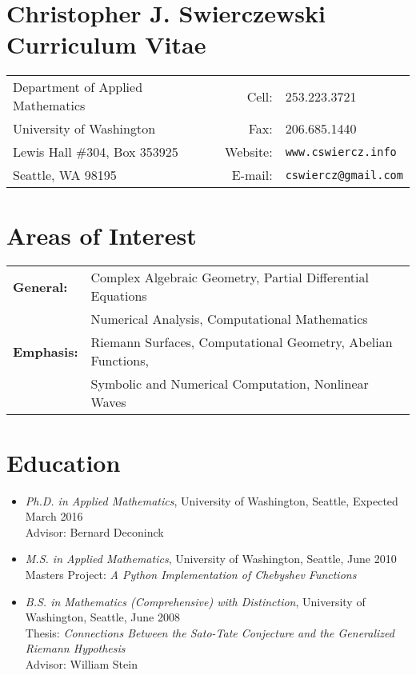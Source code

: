 \documentclass{article}
\begin{document}

\section*{Christopher J. Swierczewski \hspace{4.9cm} Curriculum Vitae}

\begin{tabular}{lrl}
  Department of Applied Mathematics \hspace{5cm} & Cell: & 253.223.3721 \\
  University of Washington                       & Fax:     & 206.685.1440 \\
  Lewis Hall \#304, Box 353925        & Website: & \tt www.cswiercz.info \\
  Seattle, WA 98195                   & E-mail:  & \tt cswiercz@gmail.com
\end{tabular}




\section*{Areas of Interest}

\begin{tabular}{ll}
  \bf General: & Complex Algebraic Geometry, Partial Differential Equations \\
               & Numerical Analysis, Computational Mathematics \\
  \bf Emphasis: & Riemann Surfaces, Computational Geometry, Abelian Functions, \\
               & Symbolic and Numerical Computation, Nonlinear Waves
\end{tabular}



\section*{Education}



\begin{itemize}
  \item {\it Ph.D. in Applied Mathematics}, University of Washington,
    Seattle, Expected March 2016 \\ Advisor: Bernard Deconinck
  \item {\it M.S. in Applied Mathematics}, University of Washington,
    Seattle, June 2010 \\ Masters Project: {\it A Python Implementation
      of Chebyshev Functions}
  \item {\it B.S. in Mathematics (Comprehensive) with Distinction},
    University of Washington, Seattle, June 2008 \\ Thesis: {\it
      Connections Between the Sato-Tate Conjecture and the Generalized
      Riemann Hypothesis} \\ Advisor: William Stein
\end{itemize}
\end{document}
